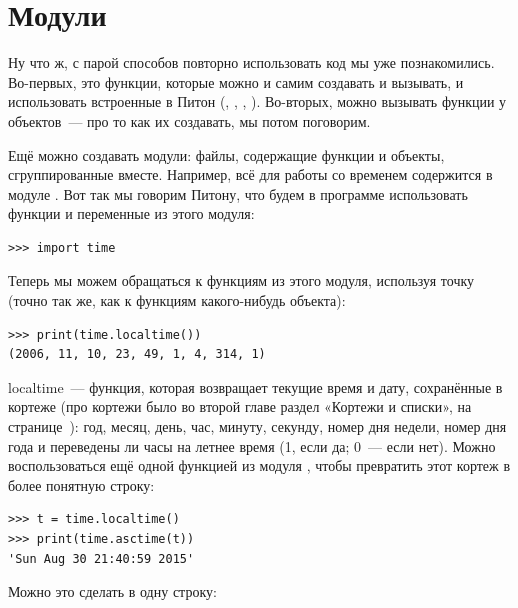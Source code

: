 \section{Модули}

Ну что ж, с парой способов повторно использовать код мы уже познакомились. Во-первых, это функции, которые можно и самим создавать и вызывать, и использовать встроенные в Питон (, , , ). Во-вторых, можно вызывать функции у объектов — про то как их создавать, мы потом поговорим.

Ещё можно создавать модули: файлы, содержащие функции и объекты, сгруппированные вместе. Например, всё для работы со временем содержится в модуле . Вот так мы говорим Питону, что будем в программе использовать функции и переменные из этого модуля:

\begin{listing}
\begin{verbatim}
>>> import time
\end{verbatim}
\end{listing}

Теперь мы можем обращаться к функциям из этого модуля, используя точку (точно так же, как к функциям какого-нибудь объекта):

\begin{listing}
\begin{verbatim}
>>> print(time.localtime())
(2006, 11, 10, 23, 49, 1, 4, 314, 1)
\end{verbatim}
\end{listing}

localtime — функция, которая возвращает текущие время и дату, сохранённые в кортеже (про кортежи было во второй главе раздел «Кортежи и списки», на странице \pageref{tuplesandlists}): год, месяц, день, час, минуту, секунду, номер дня недели, номер дня года и переведены ли часы на летнее время (1, если да; 0 — если нет). Можно воспользоваться ещё одной функцией из модуля , чтобы превратить этот кортеж в более понятную строку:

\begin{listing}
\begin{verbatim}
>>> t = time.localtime()
>>> print(time.asctime(t))
'Sun Aug 30 21:40:59 2015'
\end{verbatim}
\end{listing}

Можно это сделать в одну строку:

